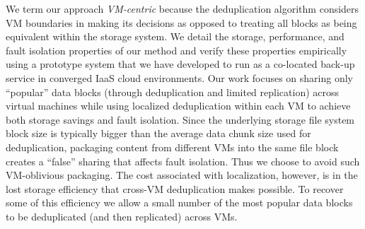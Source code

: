 We term our approach {\em VM-centric} because the deduplication
algorithm considers VM boundaries in making its decisions as opposed to
treating all blocks as being equivalent within the storage system.
We detail the storage, performance,
and fault isolation properties
of our method and verify these properties empirically using a prototype
system that we have developed to run as a co-located back-up service in
converged IaaS cloud environments.
Our work focuses on sharing only ``popular'' data blocks 
(through deduplication and limited replication)
across 
virtual machines while using localized deduplication within each VM
to achieve both storage savings and fault isolation.
Since the underlying storage file system block size is typically bigger than the average data chunk size
used for deduplication,  packaging
content from different VMs into the same file block  creates a ``false'' sharing that 
affects fault isolation. Thus we choose to avoid such VM-oblivious packaging.
The cost associated with localization, however, is in 
the lost
storage efficiency that cross-VM deduplication makes possible.  To recover
some of this efficiency we allow a small number of the most popular data
blocks to be deduplicated (and then replicated) across VMs.  




